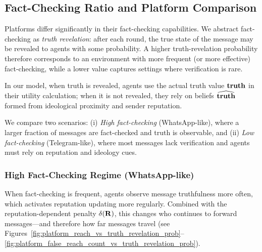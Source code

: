 \subsection{Fact-Checking Ratio and Platform Comparison}

Platforms differ significantly in their fact-checking capabilities. We abstract fact-checking as \textit{truth revelation}: after each round, the true state of the message may be revealed to agents with some probability. A higher truth-revelation probability therefore corresponds to an environment with more frequent (or more effective) fact-checking, while a lower value captures settings where verification is rare.

In our model, when truth is revealed, agents use the actual truth value $\mathbf{truth}$ in their utility calculation; when it is not revealed, they rely on beliefs $\widehat{\mathbf{truth}}$ formed from ideological proximity and sender reputation.

We compare two scenarios: (i) \textit{High fact-checking} (WhatsApp-like), where a larger fraction of messages are fact-checked and truth is observable, and (ii) \textit{Low fact-checking} (Telegram-like), where most messages lack verification and agents must rely on reputation and ideology cues.

\subsubsection{High Fact-Checking Regime (WhatsApp-like)}

When fact-checking is frequent, agents observe message truthfulness more often, which activates reputation updating more regularly. Combined with the reputation-dependent penalty $\delta(\mathbf{R})$, this changes who continues to forward messages---and therefore how far messages travel (see Figures~\ref{fig:platform_reach_vs_truth_revelation_prob}--\ref{fig:platform_false_reach_count_vs_truth_revelation_prob}).

